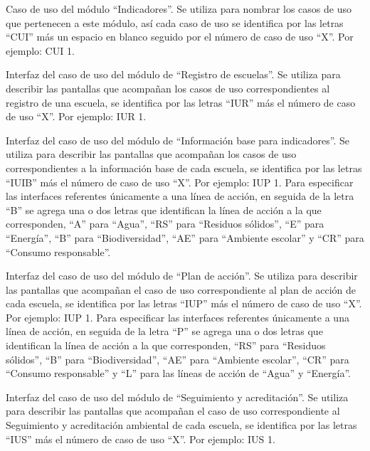 \begin{description}
	     Caso de uso del módulo ``Indicadores''. Se utiliza para nombrar los casos de uso que pertenecen a este módulo, así cada caso de uso se identifica por las letras ``CUI'' más un espacio en blanco seguido por el número de caso de uso ``X''. Por ejemplo: CUI 1.


	     Interfaz del caso de uso del módulo de ``Registro de escuelas''. Se utiliza para describir las pantallas que acompañan los casos de uso correspondientes al registro de una escuela, se identifica por las letras ``IUR'' más el número de caso de uso ``X''. Por ejemplo: IUR 1.

	     Interfaz del caso de uso del módulo de ``Información base para indicadores''. Se utiliza para describir las pantallas que acompañan los casos de uso correspondientes a la información base de cada escuela, se identifica por las letras ``IUIB'' más el número de caso de uso ``X''. Por ejemplo: IUP 1. Para especificar las interfaces referentes únicamente a una línea de acción, en seguida de la letra ``B'' se agrega una o dos letras que identifican la línea de acción a la que corresponden, ``A'' para ``Agua'', ``RS'' para ``Residuos sólidos'', ``E'' para ``Energía'',  ``B'' para ``Biodiversidad'',  ``AE'' para ``Ambiente escolar'' y  ``CR'' para ``Consumo responsable''.
	    
	     Interfaz del caso de uso del módulo de ``Plan de acción''. Se utiliza para describir las pantallas que acompañan el caso de uso correspondiente al plan de acción de cada escuela, se identifica por las letras ``IUP'' más el número de caso de uso ``X''. Por ejemplo: IUP 1. Para especificar las interfaces referentes únicamente a una línea de acción, en seguida de la letra ``P'' se agrega una o dos letras que identifican la línea de acción a la que corresponden,  ``RS'' para ``Residuos sólidos'', ``B'' para ``Biodiversidad'',  ``AE'' para ``Ambiente escolar'', ``CR'' para ``Consumo responsable'' y ``L'' para las líneas de acción de ``Agua'' y ``Energía''.

	     Interfaz del caso de uso del módulo de ``Seguimiento y acreditación''. Se utiliza para describir las pantallas que acompañan el caso de uso correspondiente al Seguimiento y acreditación ambiental de cada escuela, se identifica por las letras ``IUS'' más el número de caso de uso ``X''. Por ejemplo: IUS 1.


\end{description}

